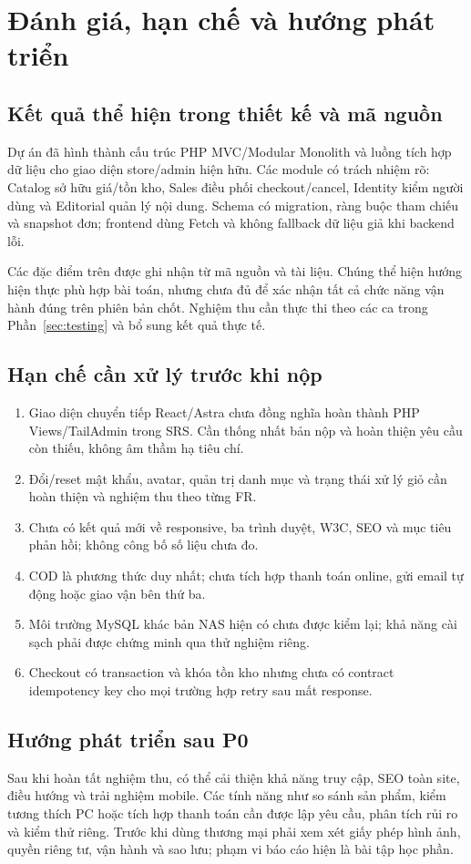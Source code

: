 \section{Đánh giá, hạn chế và hướng phát triển}
\subsection{Kết quả thể hiện trong thiết kế và mã nguồn}
Dự án đã hình thành cấu trúc PHP MVC/Modular Monolith và luồng tích hợp dữ liệu cho giao diện store/admin hiện hữu. Các module có trách nhiệm rõ: Catalog sở hữu giá/tồn kho, Sales điều phối checkout/cancel, Identity kiểm người dùng và Editorial quản lý nội dung. Schema có migration, ràng buộc tham chiếu và snapshot đơn; frontend dùng Fetch và không fallback dữ liệu giả khi backend lỗi.

Các đặc điểm trên được ghi nhận từ mã nguồn và tài liệu. Chúng thể hiện hướng hiện thực phù hợp bài toán, nhưng chưa đủ để xác nhận tất cả chức năng vận hành đúng trên phiên bản chốt. Nghiệm thu cần thực thi theo các ca trong Phần~\ref{sec:testing} và bổ sung kết quả thực tế.

\subsection{Hạn chế cần xử lý trước khi nộp}
\begin{enumerate}
\item Giao diện chuyển tiếp React/Astra chưa đồng nghĩa hoàn thành PHP Views/TailAdmin trong SRS. Cần thống nhất bản nộp và hoàn thiện yêu cầu còn thiếu, không âm thầm hạ tiêu chí.
\item Đổi/reset mật khẩu, avatar, quản trị danh mục và trạng thái xử lý giỏ cần hoàn thiện và nghiệm thu theo từng FR.
\item Chưa có kết quả mới về responsive, ba trình duyệt, W3C, SEO và mục tiêu phản hồi; không công bố số liệu chưa đo.
\item COD là phương thức duy nhất; chưa tích hợp thanh toán online, gửi email tự động hoặc giao vận bên thứ ba.
\item Môi trường MySQL khác bản NAS hiện có chưa được kiểm lại; khả năng cài sạch phải được chứng minh qua thử nghiệm riêng.
\item Checkout có transaction và khóa tồn kho nhưng chưa có contract idempotency key cho mọi trường hợp retry sau mất response.
\end{enumerate}

\subsection{Hướng phát triển sau P0}
Sau khi hoàn tất nghiệm thu, có thể cải thiện khả năng truy cập, SEO toàn site, điều hướng và trải nghiệm mobile. Các tính năng như so sánh sản phẩm, kiểm tương thích PC hoặc tích hợp thanh toán cần được lập yêu cầu, phân tích rủi ro và kiểm thử riêng. Trước khi dùng thương mại phải xem xét giấy phép hình ảnh, quyền riêng tư, vận hành và sao lưu; phạm vi báo cáo hiện là bài tập học phần.

